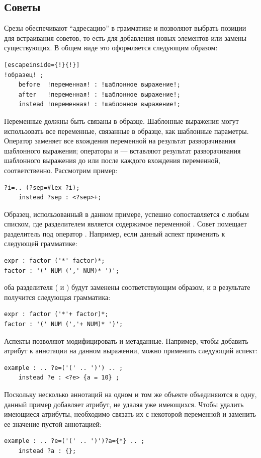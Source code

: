 \subsection{Советы}

Срезы обеспечивают ``адресацию'' в грамматике и позволяют выбрать позиции для встраивания советов, то есть для добавления новых элементов или замены существующих. В общем виде это оформляется следующим образом:
\begin{lstlisting}[escapeinside={!}{!}]
!образец! ;
	before  !переменная! : !шаблонное выражение!;
	after   !переменная! : !шаблонное выражение!;
	instead !переменная! : !шаблонное выражение!;
\end{lstlisting}
Переменные должны быть связаны в образце. Шаблонные выражения могут использовать все переменные, связанные в образце, как шаблонные параметры. Оператор  заменяет все вхождения переменной на результат разворачивания шаблонного выражения; операторы  и  --- вставляют результат разворачивания шаблонного выражения до или после каждого вхождения переменной, соответственно. Рассмотрим пример:
\begin{lstlisting}
?i=.. (?sep=#lex ?i);
	instead ?sep : <?sep>+;
\end{lstlisting}
Образец, использованный в данном примере, успешно сопоставляется с любым списком, где разделителем является содержимое переменной . Совет  помещает разделитель под оператор \code{+}. Например, если данный аспект применить к следующей грамматике:
\begin{lstlisting}
expr : factor ('*' factor)*;
factor : '(' NUM (',' NUM)* ')';
\end{lstlisting}
оба разделителя (\code{*} и \code{,}) будут заменены соответствующим образом, и в результате получится следующая грамматика:
\begin{lstlisting}
expr : factor ('*'+ factor)*;
factor : '(' NUM (','+ NUM)* ')';
\end{lstlisting}

Аспекты позволяют модифицировать и метаданные. Например, чтобы добавить атрибут к аннотации на данном выражении, можно применить следующий аспект:
\begin{lstlisting}
example : .. ?e=('(' .. ')') .. ;
	instead ?e : <?e> {a = 10} ;
\end{lstlisting}
Поскольку несколько аннотаций на одном и том же объекте объединяются в одну, данный пример добавляет атрибут, не удаляя уже имеющихся. Чтобы удалить имеющиеся атрибуты, необходимо связать их с некоторой переменной и заменить ее значение пустой аннотацией:
\begin{lstlisting}
example : .. ?e=('(' .. ')')?a={*} .. ;
	instead ?a : {};
\end{lstlisting}


